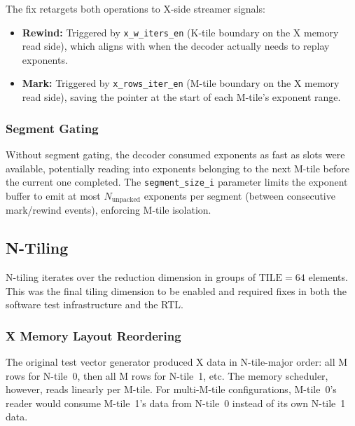 The fix retargets both operations to X-side streamer signals:
\begin{itemize}
    \item \textbf{Rewind:} Triggered by \texttt{x\_w\_iters\_en} (K-tile
          boundary on the X memory read side), which aligns with when the decoder
          actually needs to replay exponents.
    \item \textbf{Mark:} Triggered by \texttt{x\_rows\_iter\_en} (M-tile
          boundary on the X memory read side), saving the pointer at the start of
          each M-tile's exponent range.
\end{itemize}

\subsubsection{Segment Gating}

Without segment gating, the decoder consumed exponents as fast as slots were
available, potentially reading into exponents belonging to the next M-tile before
the current one completed. The \texttt{segment\_size\_i} parameter limits the
exponent buffer to emit at most $N_\text{unpacked}$ exponents per segment
(between consecutive mark/rewind events), enforcing M-tile isolation.


\subsection{N-Tiling}
\label{sec:n-tiling}

N-tiling iterates over the reduction dimension in groups of
$\text{TILE} = 64$ elements. This was the final tiling dimension to be enabled
and required fixes in both the software test infrastructure and the RTL.

\subsubsection{X Memory Layout Reordering}

The original test vector generator produced X data in N-tile-major order: all M
rows for N-tile~0, then all M rows for N-tile~1, etc. The memory scheduler,
however, reads linearly per M-tile. For multi-M-tile configurations, M-tile~0's
reader would consume M-tile~1's data from N-tile~0 instead of its own N-tile~1
data.

